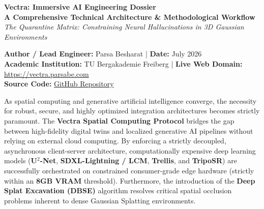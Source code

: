 \documentclass[11pt, a4paper]{article}
\begin{document}
\begin{center}
    {\color{NavyBlue}\Huge\bfseries Vectra: Immersive AI Engineering Dossier}\\[8pt]
    {\color{CyberCyan}\Large\bfseries A Comprehensive Technical Architecture \& Methodological Workflow}\\[12pt]
    {\color{DeepPurple}\large\textit{The Quarantine Matrix: Constraining Neural Hallucinations in 3D Gaussian Environments}}\\[16pt]

    \begin{tcolorbox}[enhanced, colback=SlateLight, colframe=CyberCyan, width=0.92\textwidth, arc=2mm, boxrule=0.8pt]
        \centering
        \textbf{Author / Lead Engineer:} Parsa Besharat \quad|\quad 
        \textbf{Date:} July 2026\\[2pt]
        \textbf{Academic Institution:} TU Bergakademie Freiberg \quad|\quad
        \textbf{Live Web Domain:} \href{https://vectra.parsabe.com}{https://vectra.parsabe.com}\\[2pt]
        \textbf{Source Code:} \href{https://github.com/parsabe/Vectra}{GitHub Repository}
    \end{tcolorbox}
\end{center}

\vspace{10pt}

\begin{abstractbox}
As spatial computing and generative artificial intelligence converge, the necessity for robust, secure, and highly optimized integration architectures becomes strictly paramount. The \textbf{Vectra Spatial Computing Protocol} bridges the gap between high-fidelity digital twins and localized generative AI pipelines without relying on external cloud computing. By enforcing a strictly decoupled, asynchronous client-server architecture, computationally expensive deep learning models (\textbf{U$^2$-Net}, \textbf{SDXL-Lightning / LCM}, \textbf{Trellis}, and \textbf{TripoSR}) are successfully orchestrated on constrained consumer-grade edge hardware (strictly within an \textbf{8GB VRAM} threshold). Furthermore, the introduction of the \textbf{Deep Splat Excavation (DBSE)} algorithm resolves critical spatial occlusion problems inherent to dense Gaussian Splatting environments.
\end{abstractbox}
\end{document}
